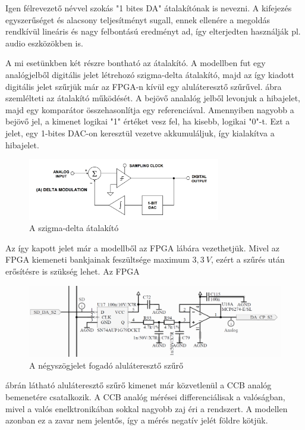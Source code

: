 Igen félrevezető névvel szokás "1 bites DA" átalakítónak is nevezni. A kifejezés egyszerűséget és alacsony teljesítményt sugall, ennek ellenére a megoldás rendkívül lineáris és nagy felbontású eredményt ad, így elterjedten használják pl. audio eszközökben is.

A mi esetünkben két részre bontható az átalakító. A modellben fut egy analógjelből digitális jelet létrehozó szigma-delta átalakító, majd az így kiadott digitális jelet szűrjük már az FPGA-n kívül egy aluláteresztő szűrűvel.  ábra szemlélteti az átalakító működését. A bejövő analalóg jelből levonjuk a hibajelet, majd egy komparátor összehasonlítja egy referenciával. Amennyiben nagyobb a bejövő jel, a kimenet logikai "1" értéket vesz fel, ha kisebb, logikai "0"-t. Ezt a jelet, egy 1-bites DAC-on keresztül vezetve akkumuláljuk, így kialakítva a hibajelet. 

\begin{figure}[!h]
	\centering
	\includegraphics[width = 0.75\textwidth]{figures/sigmadelta.png}
	\caption{A szigma-delta átalakító} 
	\label{fig:sigmadelta}
\end{figure}

Az így kapott jelet már a modellből az FPGA lábára vezethetjük. Mivel az FPGA kiemeneti bankjainak feszültsége maximum $3,3\ V$, ezért a szűrés után erősítésre is szükség lehet. Az FPGA 

\begin{figure}[!h]
	\centering
	\includegraphics[width = \textwidth]{figures/lowpassfilter.png}
	\caption{A négyszögjelet fogadó aluláteresztő szűrő} 
	\label{fig:lowpass}
\end{figure}

 ábrán látható aluláteresztő szűrő kimenet már közvetlenül a CCB analóg bemenetére csatalkozik. A CCB analóg mérései differenciálisak a valóságban, mivel a valós enelktronikában sokkal nagyobb zaj éri a rendszert. A modellen azonban ez a zavar nem jelentős, így a mérés negatív jelét földre kötjük.

